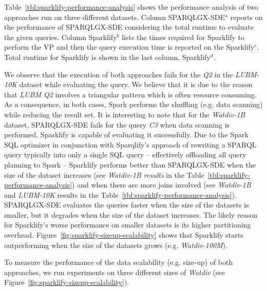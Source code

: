 Table~\ref{tbl:sparklify-performance-analysis} shows the performance analysis of two approaches run on three different datasets.
Column SPARQLGX-SDE$^{a}$ reports on the performance of SPARQLGX-SDE considering the total runtime to evaluate the given queries.
Column Sparklify$^{b}$ lists the times required for Sparklify to perform the VP and then the query execution time is reported on the Sparklify$^{c}$.
Total runtime for Sparklify is shown in the last column, Sparklify$^{d}$.

We observe that the execution of both approaches fails for the \textit{Q2} in the \textit{LUBM-10K} dataset while evaluating the query. 
We believe that it is due to the reason that \textit{LUBM Q2} involves a triangular pattern which is often resource consuming. 
As a consequence, in both cases, Spark performs the shuffling (e.g. data scanning) while reducing the result set.
It is interesting to note that for the \textit{Watdiv-1B} dataset, SPARQLGX-SDE fails for the query \textit{C3} when data scanning is performed. 
Sparklify is capable of evaluating it successfully.
Due to the Spark SQL optimizer in conjunction with Sparqlify's approach of rewriting a SPARQL query typically into only a single SQL query -- effectively offloading all query planning to Spark -- Sparklify performs better than SPARQLGX-SDE when the size of the dataset increases (see \textit{Watdiv-1B results} in the Table~\ref{tbl:sparklify-performance-analysis}) and when there are more joins involved (see \textit{Watdiv-1B} and \textit{LUBM-10K} results in the Table~\ref{tbl:sparklify-performance-analysis}).
SPARQLGX-SDE evaluates the queries faster when the size of the datasets is smaller, but it degrades when the size of the dataset increases.
The likely reason for Sparklify's worse performance on smaller datasets is its higher partitioning overhead.
Figure~\ref{fig:sparklify-sizeup-scalability} shows that Sparklify starts outperforming when the size of the datasets grows (e.g. \textit{Watdiv-100M}).

To measure the performance of the data scalability (e.g. size-up) of both approaches, we run experiments on three different sizes of \textit{Watdiv} (see Figure~\ref{fig:sparklify-sizeup-scalability}).

